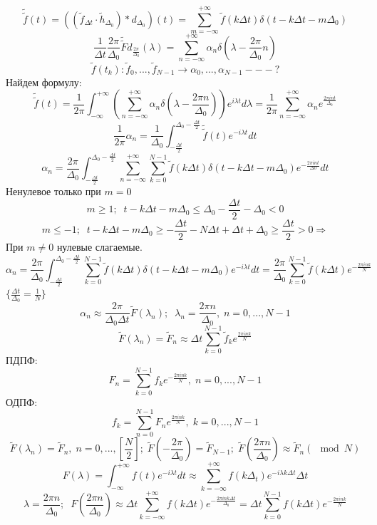 \[\widetilde{\widetilde{f}}(t) = ((\widetilde{f}_{\Delta t}\cdot \widetilde{h}_{\Delta_0})*d_{\Delta_0})(t) = \sum_{m = -\infty}^{+\infty} \widetilde{f}(k\Delta t)\delta(t - k\Delta t - m\Delta_0)\]
\[\frac{1}{\Delta t}\frac{2\pi}{\Delta_0}\widetilde{\widetilde{F}}d_{\frac{2\pi}{\Delta_0}}(\lambda) = \sum_{n = -\infty}^{+\infty} \alpha_n\delta(\lambda - \frac{2\pi}{\Delta_0}n)\]
\[\widetilde{f}(t_k) : \widetilde{f}_0, ..., \widetilde{f}_{N - 1} \rightarrow \alpha_0, ..., \alpha_{N - 1} --- ?\]
Найдем формулу:
\[\widetilde{\widetilde{f}}(t) = \frac{1}{2\pi}\int_{-\infty}^{+\infty}(\sum_{n = -\infty}^{+\infty} \alpha_n\delta(\lambda - \frac{2\pi n}{\Delta_0}))e^{i\lambda t}d\lambda = \frac{1}{2\pi}\sum_{n = -\infty}^{+\infty} \alpha_n e^{\frac{2\pi int}{\Delta_0}}\]
\[\frac{1}{2\pi}\alpha_n = \frac{1}{\Delta_0}\int_{-\frac{\Delta t}{2}}^{\Delta_0 - \frac{\Delta t}{2}} \widetilde{\widetilde{f}}(t)e^{-i\lambda t}dt\]
\[\alpha_n = \frac{2\pi}{\Delta_0}\int_{-\frac{\Delta t}{2}}^{\Delta_0 - \frac{\Delta t}{2}} \sum_{n = -\infty}^{+\infty} \sum_{k = 0}^{N - 1} \widetilde{f}(k\Delta t)\delta(t - k\Delta t - m\Delta_0)e^{-\frac{2\pi int}{\Delta 0}}dt\]
Ненулевое только при $m = 0$
\[m \geq 1 ;\;\; t - k\Delta t - m\Delta_0 \leq \Delta_0 - \frac{\Delta t}{2} - \Delta_0 < 0\]
\[m \leq -1 ;\;\; t - k\Delta t - m\Delta_0 \geq -\frac{\Delta t}{2} - N\Delta t + \Delta t + \Delta_0 \geq \frac{\Delta t}{2} > 0 \Rightarrow\]
При $m \neq 0$ нулевые слагаемые.
\[\alpha_n = \frac{2\pi}{\Delta_0}\int_{-\frac{\Delta t}{2}}^{\Delta_0 - \frac{\Delta t}{2}} \sum_{k = 0}^{N - 1} \widetilde{f}(k\Delta t)\delta(t - k\Delta t - m\Delta_0)e^{-i\lambda t}dt = \frac{2\pi}{\Delta_0}\sum_{k = 0}^{N - 1} \widetilde{f}(k\Delta t)e^{-\frac{2\pi ink}{N}} \]
\(\{\frac{\Delta t}{\Delta_0} = \frac{1}{N}\}\)
\[\alpha_n \approx \frac{2\pi}{\Delta_0\Delta t}\widetilde{F}(\lambda_n);\;\;\lambda_n = \frac{2\pi n}{\Delta_0},\; n = 0, ..., N - 1\]
\[\widetilde{F}(\lambda_n) = \widetilde{F}_n \approx \Delta t\sum_{k = 0}^{N - 1}\widetilde{f}_ke^{\frac{2\pi ink}{N}}\]
ПДПФ: \[F_n = \sum_{k = 0}^{N - 1} f_k e^{-\frac{2\pi ink}{N}},\; n = 0, ..., N - 1\]
ОДПФ: \[f_k = \sum_{n = 0}^{N - 1} F_n e^{\frac{2\pi ink}{N}},\; k = 0, ..., N - 1\]
\[\widetilde{F}(\lambda_n) = \widetilde{F}_n,\; n = 0, ..., [\frac{N}{2}];\;\widetilde{F}(-\frac{2\pi}{\Delta_0}) = \widetilde{F}_{N - 1};\; \widetilde{F}(\frac{2\pi n}{\Delta_0}) \approx \widetilde{F}_n(\mod N)\]
\[F(\lambda) = \int_{-\infty}^{+\infty} f(t)e^{-i\lambda t}dt \approx \sum_{k = -\infty}^{+\infty} f(k\Delta_t)e^{-i\lambda k\Delta t}\Delta t\]
\[\lambda = \frac{2\pi n}{\Delta_0};\;\; F(\frac{2\pi n}{\Delta_0}) \approx \Delta t\sum_{k = -\infty}^{+\infty} f(k\Delta t)e^{-\frac{2\pi ink\Delta t}{\Delta_0}} = \Delta t\sum_{k = 0}^{N - 1} f(k\Delta t)e^{-\frac{2\pi ink}{N}}\]
